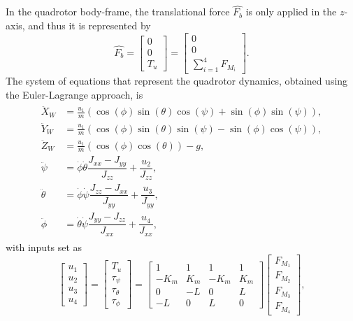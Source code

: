 \\\\
In the quadrotor body-frame, the translational force $\hat{F_{b}}$ is only applied in the $z$-axis, and thus it is represented by
\begin{equation}
	\hat{F_{b}}=\begin{bmatrix}
	0\\
	0\\
	T_u
	\end{bmatrix} = \begin{bmatrix}
	0\\
	0\\
	\sum_{i=1}^{4}F_{M_i}
	\end{bmatrix}.
 \label{ec:fuerzas}
 \end{equation} 
The system of equations that represent the quadrotor dynamics, obtained using the Euler-Lagrange approach, is
\begin{align}
\label{ec:eomEulerLagrange}
\begin{split}
\ddot{X}_W &= \frac{u_{1}}{m}(\cos(\phi)\sin(\theta)\cos(\psi) + \sin(\phi)\sin(\psi)), \\[5pt]
\ddot{Y}_W &= \frac{u_{1}}{m}(\cos(\phi)\sin(\theta)\sin(\psi) - \sin(\phi)\cos(\psi)), \\[5pt]
\ddot{Z}_W &= \frac{u_{1}}{m}(\cos(\phi)\cos(\theta)) - g, \\[5pt]
\ddot{\psi} & = \dot{\phi}\dot{\theta}\dfrac{J_{xx}-J_{yy}}{J_{zz}} + \dfrac{u_{2}}{J_{zz}}, \\[5pt]
\ddot{\theta} & = \dot{\phi}\dot{\psi}\dfrac{J_{zz}-J_{xx}}{J_{yy}} + \dfrac{u_{3}}{J_{yy}}, \\[5pt]
\ddot{\phi} & = \dot{\theta}\dot{\psi}\dfrac{J_{yy}-J_{zz}}{J_{xx}} +  \dfrac{u_{4}}{J_{xx}},
\end{split}
\end{align}
with inputs set as
\begin{equation}
\begin{bmatrix}
u_1 \\[5pt] u_2 \\[5pt] u_3 \\[5pt] u_4
\end{bmatrix} = \begin{bmatrix}
	T_u\\[5pt]
	\tau_{\psi}\\[5pt]
	\tau_{\theta}\\[5pt]
	\tau_{\phi}
	\end{bmatrix} = \begin{bmatrix}
	1 & 1 & 1 & 1 \\[5pt]
	-K_{m} & K_{m} & -K_{m} & K_{m}\\[5pt]
	0 & -L & 0 & L\\[5pt]
	-L & 0 & L & 0
							\end{bmatrix}
\begin{bmatrix}
F_{M_1}\\[5pt]
F_{M_2}\\[5pt]
F_{M_3}\\[5pt]
F_{M_4}
\end{bmatrix},				
\end{equation}
